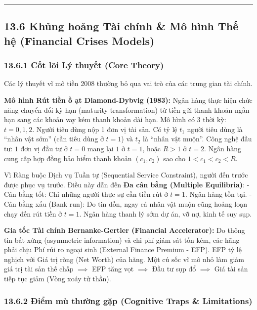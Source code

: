 \documentclass[
]{article}
\begin{document}
\begin{center}\rule{0.5\linewidth}{0.5pt}\end{center}

\subsection{13.6 Khủng hoảng Tài chính \& Mô hình Thế hệ (Financial
Crises
Models)}\label{khux1ee7ng-houx1ea3ng-tuxe0i-chuxednh-muxf4-huxecnh-thux1ebf-hux1ec7-financial-crises-models}

\subsubsection{13.6.1 Cốt lõi Lý thuyết (Core
Theory)}\label{cux1ed1t-luxf5i-luxfd-thuyux1ebft-core-theory-44}

Các lý thuyết vĩ mô tiền 2008 thường bỏ qua vai trò của các trung gian
tài chính.

\textbf{Mô hình Rút tiền ồ ạt Diamond-Dybvig (1983):} Ngân hàng thực
hiện chức năng chuyển đổi kỳ hạn (maturity transformation) từ tiền gửi
thanh khoản ngắn hạn sang các khoản vay kém thanh khoản dài hạn. Mô hình
có 3 thời kỳ: \(t=0, 1, 2\). Người tiêu dùng nộp 1 đơn vị tài sản. Có tỷ
lệ \(t_1\) người tiêu dùng là ``nhân vật sớm'' (cần tiêu dùng ở \(t=1\))
và \(t_2\) là ``nhân vật muộn''. Công nghệ đầu tư: \(1\) đơn vị đầu tư ở
\(t=0\) mang lại \(1\) ở \(t=1\), hoặc \(R > 1\) ở \(t=2\). Ngân hàng
cung cấp hợp đồng bảo hiểm thanh khoản \((c_1, c_2)\) sao cho
\(1 < c_1 < c_2 < R\).

Vì Ràng buộc Dịch vụ Tuần tự (Sequential Service Constraint), người đến
trước được phục vụ trước. Điều này dẫn đến \textbf{Đa cân bằng (Multiple
Equilibria)}: - Cân bằng tốt: Chỉ những người thực sự cần tiền rút ở
\(t=1\). Ngân hàng tồn tại. - Cân bằng xấu (Bank run): Do tin đồn, ngay
cả nhân vật muộn cũng hoảng loạn chạy đến rút tiền ở \(t=1\). Ngân hàng
thanh lý sớm dự án, vỡ nợ, kinh tế suy sụp.

\textbf{Gia tốc Tài chính Bernanke-Gertler (Financial Accelerator):} Do
thông tin bất xứng (asymmetric information) và chi phí giám sát tốn kém,
các hãng phải chịu Phí rủi ro ngoại sinh (External Finance Premium -
EFP). EFP tỷ lệ nghịch với Giá trị ròng (Net Worth) của hãng. Một cú sốc
vĩ mô nhỏ làm giảm giá trị tài sản thế chấp \(\implies\) EFP tăng vọt
\(\implies\) Đầu tư sụp đổ \(\implies\) Giá tài sản tiếp tục giảm (Vòng
xoáy tử thần).

\subsubsection{13.6.2 Điểm mù thường gặp (Cognitive Traps \&
Limitations)}\label{ux111iux1ec3m-muxf9-thux1b0ux1eddng-gux1eb7p-cognitive-traps-limitations-95}
\end{document}
